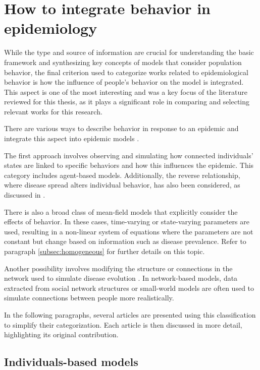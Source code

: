 \section{How to integrate behavior in epidemiology}
While the type and source of information are crucial for understanding the basic framework and synthesizing key concepts of models that consider population behavior, the final criterion used to categorize works related to epidemiological behavior is how the influence of people's behavior on the model is integrated. This aspect is one of the most interesting and was a key focus of the literature reviewed for this thesis, as it plays a significant role in comparing and selecting relevant works for this research.

There are various ways to describe behavior in response to an epidemic and integrate this aspect into epidemic models \cite{Wang_2019, Bedson2021, Wang_2015_review}.

The first approach involves observing and simulating how connected individuals' states are linked to specific behaviors and how this influences the epidemic. This category includes agent-based models. Additionally, the reverse relationship, where disease spread alters individual behavior, has also been considered, as discussed in \cite{Granell_2014}.

There is also a broad class of mean-field models that explicitly consider the effects of behavior. In these cases, time-varying or state-varying parameters are used, resulting in a non-linear system of equations where the parameters are not constant but change based on information such as disease prevalence. Refer to paragraph \ref{subsec:homogeneous} for further details on this topic.

Another possibility involves modifying the structure or connections in the network used to simulate disease evolution \cite{Peng2021}. In network-based models, data extracted from social network structures \cite{Carballosa_2021} or small-world models \cite{Turker_2023} are often used to simulate connections between people more realistically.

In the following paragraphs, several articles are presented using this classification to simplify their categorization. Each article is then discussed in more detail, highlighting its original contribution.

\subsection{Individuals-based models}
\label{subsec:individual_state}
